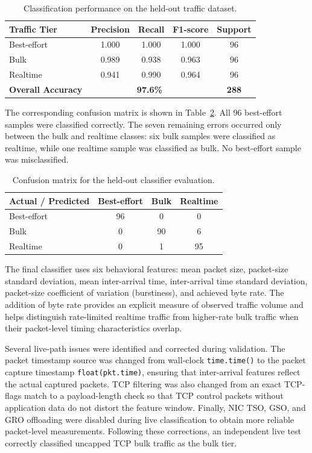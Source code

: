 \begin{table}[t]
\centering
\caption{Classification performance on the held-out traffic dataset.}
\label{tab:classifier-performance}
\begin{tabular}{lcccc}
\hline
\textbf{Traffic Tier} & \textbf{Precision} & \textbf{Recall} &
\textbf{F1-score} & \textbf{Support} \\
\hline
Best-effort & 1.000 & 1.000 & 1.000 & 96 \\
Bulk        & 0.989 & 0.938 & 0.963 & 96 \\
Realtime    & 0.941 & 0.990 & 0.964 & 96 \\
\hline
\textbf{Overall Accuracy} & \multicolumn{3}{c}{\textbf{97.6\%}} &
\textbf{288} \\
\hline
\end{tabular}
\end{table}

The corresponding confusion matrix is shown in
Table~\ref{tab:classifier-confusion}. All 96 best-effort samples were
classified correctly. The seven remaining errors occurred only between
the bulk and realtime classes: six bulk samples were classified as
realtime, while one realtime sample was classified as bulk. No
best-effort sample was misclassified.

\begin{table}[t]
\centering
\caption{Confusion matrix for the held-out classifier evaluation.}
\label{tab:classifier-confusion}
\begin{tabular}{lccc}
\hline
\textbf{Actual / Predicted} & \textbf{Best-effort} &
\textbf{Bulk} & \textbf{Realtime} \\
\hline
Best-effort & 96 & 0  & 0  \\
Bulk        & 0  & 90 & 6  \\
Realtime    & 0  & 1  & 95 \\
\hline
\end{tabular}
\end{table}

The final classifier uses six behavioral features: mean packet size,
packet-size standard deviation, mean inter-arrival time, inter-arrival
time standard deviation, packet-size coefficient of variation
(burstiness), and achieved byte rate. The addition of byte rate provides
an explicit measure of observed traffic volume and helps distinguish
rate-limited realtime traffic from higher-rate bulk traffic when their
packet-level timing characteristics overlap.

Several live-path issues were identified and corrected during
validation. The packet timestamp source was changed from wall-clock
\texttt{time.time()} to the packet capture timestamp
\texttt{float(pkt.time)}, ensuring that inter-arrival features reflect
the actual captured packets. TCP filtering was also changed from an
exact TCP-flags match to a payload-length check so that TCP control
packets without application data do not distort the feature window.
Finally, NIC TSO, GSO, and GRO offloading were disabled during live
classification to obtain more reliable packet-level measurements.
Following these corrections, an independent live test correctly
classified uncapped TCP bulk traffic as the bulk tier.

